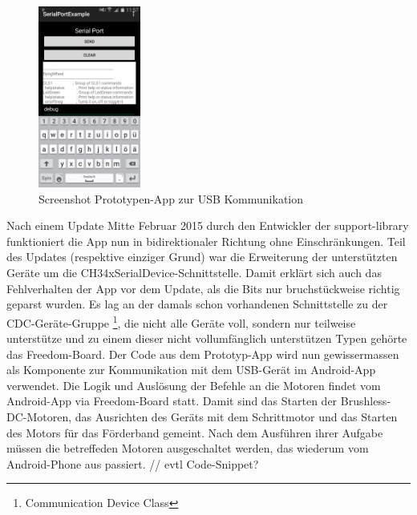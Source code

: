 \begin{figure}[h!]
	\includegraphics[width=0.3\textwidth,clip,trim=0mm 0mm 0mm 0mm]
	{Enddokumentation/Bilder/Screenshot_SerialPortExample_debug.png}
	\centering
	\caption{Screenshot Prototypen-App zur USB Kommunikation}
	\label{abb:ScreenshotSerialPortExample}
\end{figure}
\newline
Nach einem Update Mitte Februar 2015 durch den Entwickler der support-library funktioniert die App nun 
in bidirektionaler Richtung ohne Einschränkungen. Teil des Updates (respektive einziger Grund) war die 
Erweiterung der unterstützten Geräte um die CH34xSerialDevice-Schnittstelle. Damit erklärt sich auch das 
Fehlverhalten der  App vor dem Update, als die Bits nur bruchstückweise richtig geparst wurden. Es lag 
an der damals schon vorhandenen Schnittstelle zu der CDC-Geräte-Gruppe \footnote{Communication Device Class}, 
die nicht alle Geräte voll, sondern nur teilweise unterstütze und zu einem dieser nicht vollumfänglich 
unterstützen Typen gehörte das Freedom-Board. \newline
Der Code aus dem  Prototyp-App wird nun gewissermassen als Komponente zur Kommunikation mit dem USB-Gerät
im Android-App verwendet. 
\newline
\newline
Die Logik und Auslösung der Befehle an die Motoren findet vom Android-App via Freedom-Board statt. Damit 
sind das Starten der Brushless-DC-Motoren, das Ausrichten des Geräts mit dem Schrittmotor und das Starten 
des Motors für das Förderband gemeint. Nach dem Ausführen ihrer Aufgabe müssen die betreffeden Motoren 
ausgeschaltet werden, das wiederum vom Android-Phone aus passiert.
\newline
\newline
// evtl Code-Snippet?
